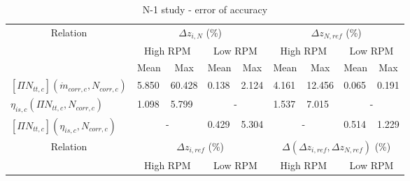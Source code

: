 \begin{longtable}[c]{@{}lclcl|clcl@{}}
\caption{N-1 study - error of accuracy}
\label{tab:C7_Nm1}\\
\toprule
\multicolumn{1}{c}{\multirow{3}{*}{Relation}} & \multicolumn{4}{c|}{$\Delta z_{i,N}$ (\%)}                                                                  & \multicolumn{4}{c}{$\Delta z_{N,ref}$ (\%)}                                                                   \\
\multicolumn{1}{c}{}                          & \multicolumn{2}{c}{High RPM}                         & \multicolumn{2}{c|}{Low RPM}                         & \multicolumn{2}{c}{High RPM}                          & \multicolumn{2}{c}{Low RPM}                           \\
\multicolumn{1}{c}{}                          & Mean                       & \multicolumn{1}{c}{Max} & Mean                      & \multicolumn{1}{c|}{Max} & Mean                        & \multicolumn{1}{c}{Max} & Mean                        & \multicolumn{1}{c}{Max} \\* \midrule
\endfirsthead
%
\endhead
%
\bottomrule
\endfoot
%
\endlastfoot
%
$[\Pi N_{tt,c}](\dot{m}_{corr,c},N_{corr,c})$ & \multicolumn{1}{l}{5.850}  & 60.428                  & \multicolumn{1}{l}{0.138} & 2.124                    & \multicolumn{1}{l}{4.161}   & 12.456                  & \multicolumn{1}{l}{0.065}   & 0.191                   \\
$\eta_{is,c}(\Pi N_{tt,c},N_{corr,c})$        & \multicolumn{1}{l}{1.098}  & 5.799                   & \multicolumn{2}{c|}{-}                               & \multicolumn{1}{l}{1.537}   & 7.015                   & \multicolumn{2}{c}{-}                                 \\
$[\Pi N_{tt,c}](\eta_{is,c},N_{corr,c})$      & \multicolumn{2}{c}{-}                                & \multicolumn{1}{l}{0.429} & 5.304                    & \multicolumn{2}{c}{-}                                 & \multicolumn{1}{l}{0.514}   & 1.229                   \\* \midrule
\multicolumn{1}{c}{\multirow{3}{*}{Relation}} & \multicolumn{4}{c|}{$\Delta z_{i,ref}$ (\%)}                                                                & \multicolumn{4}{c}{$\Delta \left(\Delta z_{i,ref}, \Delta z_{N,ref}\right)$ (\%)}                             \\
\multicolumn{1}{c}{}                          & \multicolumn{2}{c}{High RPM}                         & \multicolumn{2}{c|}{Low RPM}                         & \multicolumn{2}{c}{High RPM}                          & \multicolumn{2}{c}{Low RPM}                           \\

\end{longtable}
